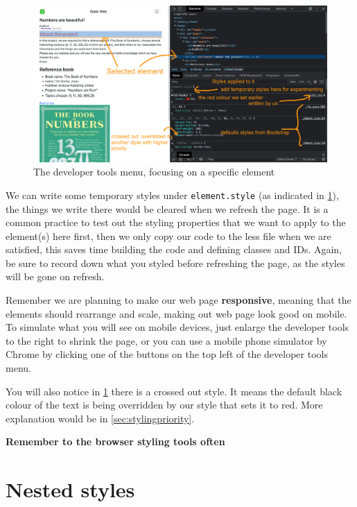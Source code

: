 \begin{figure}[h]
\centering
\includegraphics[width=14cm]{images/chn6-devtools2.png}
\caption{The developer tools menu, focusing on a specific element}
\label{fig:devtools2}
\end{figure}

We can write some temporary styles under \texttt{element.style} (as indicated in \cref{fig:devtools2}), the things we write there would be cleared when we refresh the page. It is a common practice to test out the styling properties that we want to apply to the element(s) here first, then we only copy our code to the less file when we are satisfied, this saves time building the code and defining classes and IDs. Again, be sure to record down what you styled before refreshing the page, as the styles will be gone on refresh. 
\vspace{6mm}

Remember we are planning to make our web page \textbf{responsive}, meaning that the elements should rearrange and scale, making out web page look good on mobile. To simulate what you will see on mobile devices, just enlarge the developer tools to the right to shrink the page, or you can use a mobile phone simulator by Chrome by clicking one of the buttons on the top left of the developer tools menu.

You will also notice in \cref{fig:devtools2} there is a crossed out style. It means the default black colour of the text is being overridden by our style that sets it to red. More explanation would be in \cref{sec:stylingpriority}.
\vspace{6mm}

\textbf{Remember to the browser styling tools often}

\section{Nested styles}
\label{sec:nestedstyles}

